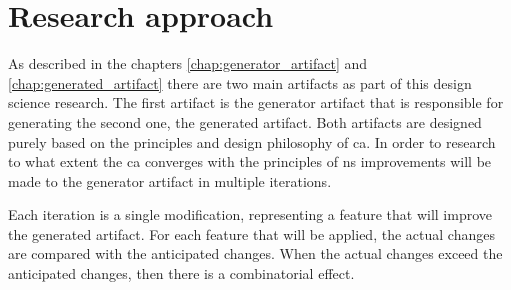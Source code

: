 \chapter{Research approach} \label{chap:research_approach}

As described in the chapters \ref{chap:generator_artifact} and
\ref{chap:generated_artifact} there are two main artifacts as part of this design science
research. The first artifact is the generator artifact that is responsible for generating
the second one, the generated artifact. Both artifacts are designed purely based on the
principles and design philosophy of \acrshort{ca}. In order to research to what extent the
\acrshort{ca} converges with the principles of \acrshort{ns} improvements will be made to
the generator artifact in multiple iterations.

Each iteration is a single modification, representing a feature that will improve the
generated artifact. For each feature that will be applied, the actual changes are compared
with the anticipated changes. When the actual changes exceed the anticipated changes,
then there is a combinatorial effect.